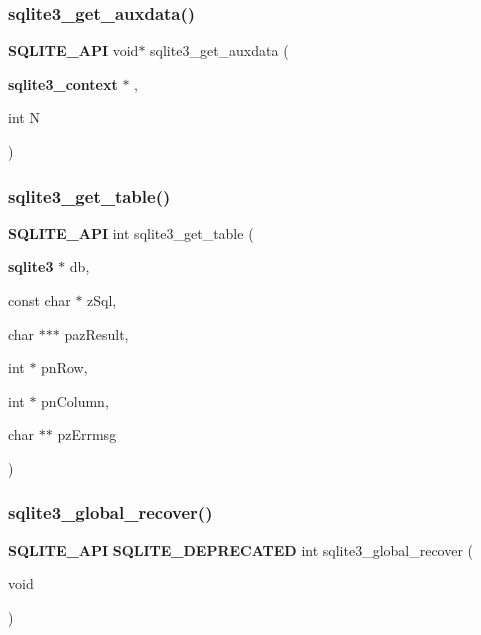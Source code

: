 \mbox{\label{sqlite3_8h_afc69e45b0a17731cd940538834877d36}} 
\subsubsection{sqlite3\_get\_auxdata()}
{\footnotesize\ttfamily \textbf{ S\+Q\+L\+I\+T\+E\+\_\+\+A\+PI} void$\ast$ sqlite3\+\_\+get\+\_\+auxdata (\begin{DoxyParamCaption}\item[{\textbf{ sqlite3\+\_\+context} $\ast$}]{,  }\item[{int}]{N }\end{DoxyParamCaption})}

\mbox{\label{sqlite3_8h_a5effeac4e12df57beaa35c5be1f61579}} 
\subsubsection{sqlite3\_get\_table()}
{\footnotesize\ttfamily \textbf{ S\+Q\+L\+I\+T\+E\+\_\+\+A\+PI} int sqlite3\+\_\+get\+\_\+table (\begin{DoxyParamCaption}\item[{\textbf{ sqlite3} $\ast$}]{db,  }\item[{const char $\ast$}]{z\+Sql,  }\item[{char $\ast$$\ast$$\ast$}]{paz\+Result,  }\item[{int $\ast$}]{pn\+Row,  }\item[{int $\ast$}]{pn\+Column,  }\item[{char $\ast$$\ast$}]{pz\+Errmsg }\end{DoxyParamCaption})}

\mbox{\label{sqlite3_8h_ac423589160db82ded3ff3dc3c85ba1d1}} 
\subsubsection{sqlite3\_global\_recover()}
{\footnotesize\ttfamily \textbf{ S\+Q\+L\+I\+T\+E\+\_\+\+A\+PI} \textbf{ S\+Q\+L\+I\+T\+E\+\_\+\+D\+E\+P\+R\+E\+C\+A\+T\+ED} int sqlite3\+\_\+global\+\_\+recover (\begin{DoxyParamCaption}\item[{void}]{ }\end{DoxyParamCaption})}

